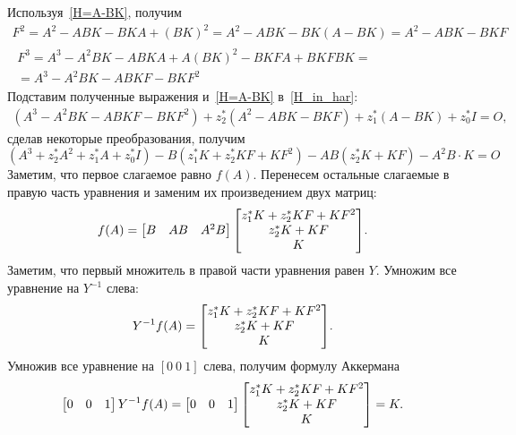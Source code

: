 \documentclass[12pt,a4paper,openany]{extarticle}
\begin{document}
Используя~\eqref{H=A-BK}, получим
\begin{gather}
	F^2 = A^2 - ABK - BKA + (BK)^2 = A^2 - ABK - BK(A-BK) = A^2-ABK-BKF\\
	\begin{split}
	F^3 = A^3 - A^2BK - ABKA + A(BK)^2 -  BKFA + BKFBK  =\\= A^3 - A^2BK - ABKF - BKF^2
	\end{split}
\end{gather}
Подставим полученные выражения и~\eqref{H=A-BK} в~\eqref{H_in_har}:
\begin{gather}
	(A^3 - A^2BK - ABKF - BKF^2) + z^*_2(A^2-ABK-BKF) + z^*_1(A-BK) + z^*_0I = O,
\end{gather}
сделав некоторые преобразования, получим
\begin{equation}
	(A^3 + z^*_2A^2 + z^*_1A + z^*_0I) - B(z_1^*K + z_2^*KF + KF^2) - AB(z_2^*K + KF) - A^2B\cdot K = O
\end{equation}
Заметим, что первое слагаемое равно $f(A)$.
Перенесем остальные слагаемые в правую часть уравнения и заменим их произведением двух матриц:
\begin{equation}
	f(A) =  
	\begin{bmatrix}
		B & AB & A^2B
	\end{bmatrix} 
	\begin{bmatrix}
		z_1^*K + z_2^*KF + KF^2\\
		z_2^*K + KF\\
		K	
	\end{bmatrix}\!\ldotp
\end{equation}
Заметим, что первый множитель в правой части уравнения равен $Y$.
Умножим все уравнение на $Y^{-1}$ слева:
\begin{equation}
	Y^{-1}f(A) =  
	\begin{bmatrix}
		z_1^*K + z_2^*KF + KF^2\\
		z_2^*K + KF\\
		K	
	\end{bmatrix}\!\ldotp
\end{equation}
Умножив все уравнение на $[0\ 0\ 1]$ слева, получим формулу Аккермана
\begin{equation}
	\begin{bmatrix}
		0 & 0 & 1
	\end{bmatrix}
	Y^{-1}f(A) =  
	\begin{bmatrix}
		0 & 0 & 1
	\end{bmatrix}	
	\begin{bmatrix}
		z_1^*K + z_2^*KF + KF^2\\
		z_2^*K + KF\\
		K	
	\end{bmatrix}=K\ldotp
\end{equation}
\end{document}
